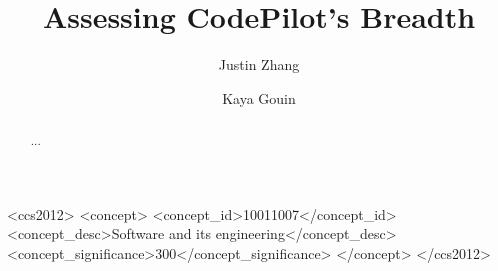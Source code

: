 \documentclass[sigconf]{acmart}
\begin{document}
\title{Assessing CodePilot's Breadth}

\author{Justin Zhang}
\author{Kaya Gouin}
\authornotemark[1]


\begin{abstract}
	...
\end{abstract}

\begin{CCSXML}
	<ccs2012>
	<concept>
	<concept_id>10011007</concept_id>
	<concept_desc>Software and its engineering</concept_desc>
	<concept_significance>300</concept_significance>
	</concept>
	</ccs2012>
\end{CCSXML}

\end{document}
